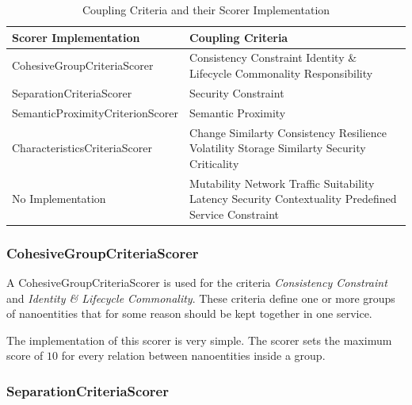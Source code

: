 \begin{table}[H]
	\centering
	\caption{Coupling Criteria and their Scorer Implementation}
	\label{tab:scorer}
	\begin{tabular}{|p{170pt}|p{200pt}|}
		\hline	
		\textbf{Scorer Implementation} & \textbf{Coupling Criteria}  \\
		\hline
		CohesiveGroupCriteriaScorer & Consistency Constraint \newline Identity \& Lifecycle Commonality \newline Responsibility  \\
		\hline
		SeparationCriteriaScorer & Security Constraint  \\
		\hline
		SemanticProximityCriterionScorer & Semantic Proximity \\
		\hline
		CharacteristicsCriteriaScorer & Change Similarty \newline Consistency \newline Resilience \newline Volatility \newline Storage Similarty \newline Security Criticality  \\
		\hline
		No Implementation & Mutability \newline Network Traffic Suitability \newline Latency \newline Security Contextuality \newline Predefined Service Constraint  \\
		\hline
	\end{tabular}
\end{table}

\subsubsection{CohesiveGroupCriteriaScorer}

A CohesiveGroupCriteriaScorer is used for the criteria \textit{Consistency Constraint} and \textit{Identity \& Lifecycle Commonality}. These criteria define one or more groups of nanoentities that for some reason should be kept together in one service.

The implementation of this scorer is very simple. The scorer sets the maximum score of $10$ for every relation between nanoentities inside a group. 

\subsubsection{SeparationCriteriaScorer}

